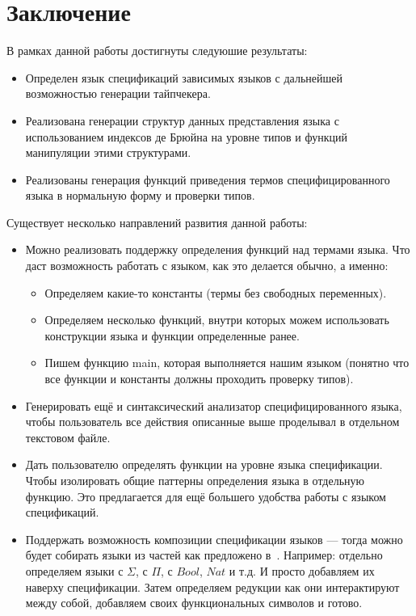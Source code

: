 \documentclass{spbau-diploma}
\begin{document}





\section*{Заключение}

В рамках данной работы достигнуты следуюшие результаты:
\begin{itemize}
  \item Определен язык спецификаций зависимых языков с дальнейшей возможностью генерации тайпчекера.
  \item Реализована генерации структур данных представления языка с использованием индексов де Брюйна на уровне типов и функций манипуляции этими структурами.
  \item Реализованы генерация функций приведения термов специфицированного языка в нормальную форму и проверки типов.
\end{itemize}

Существует несколько направлений развития данной работы:
\begin{itemize}
  \item Можно реализовать поддержку определения функций над термами языка. Что даст возможность работать с языком, как это делается обычно, а именно:
  \begin{itemize}
    \item Определяем какие-то константы (термы без свободных переменных).
    \item Определяем несколько функций, внутри которых можем использовать конструкции языка и функции определенные ранее.
    \item Пишем функцию main, которая выполняется нашим языком (понятно что все функции и константы должны проходить проверку типов).
  \end{itemize}
  \item Генерировать ещё и синтаксический анализатор специфицированного языка, чтобы пользователь все действия описанные выше проделывал в отдельном текстовом файле.
  \item Дать пользователю определять функции на уровне языка спецификации. Чтобы изолировать общие паттерны определения языка в отдельную функцию. Это предлагается для ещё большего удобства работы с языком спецификаций.
  \item Поддержать возможность композиции спецификации языков --- тогда можно будет собирать языки из частей как предложено в~\cite{isaev}. Например: отдельно определяем языки с $\Sigma$, с $\Pi$, с $Bool$, $Nat$ и т.д. И просто добавляем их наверху спецификации. Затем определяем редукции как они интерактируют между собой, добавляем своих функциональных символов и готово.
\end{itemize}






\end{document}
